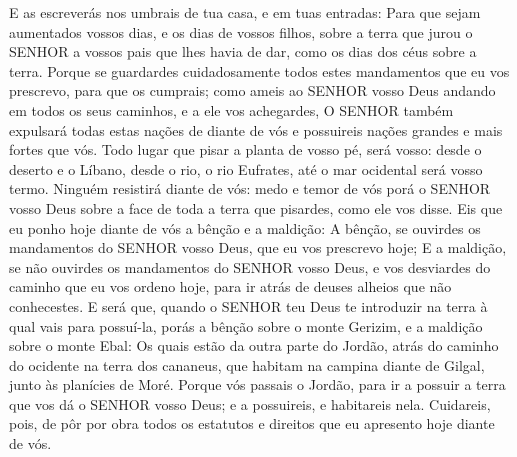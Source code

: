 {{  E as escreverás nos umbrais de tua casa, e em tuas entradas:
  Para que sejam aumentados vossos dias, e os dias de vossos filhos, sobre a terra que jurou o SENHOR a vossos pais que lhes havia de dar, como os dias dos céus sobre a terra.
  Porque se guardardes cuidadosamente todos estes mandamentos que eu vos prescrevo, para que os cumprais; como ameis ao SENHOR vosso Deus andando em todos os seus caminhos, e a ele vos achegardes,
  O SENHOR também expulsará todas estas nações de diante de vós e possuireis nações grandes e mais fortes que vós.
  Todo lugar que pisar a planta de vosso pé, será vosso: desde o deserto e o Líbano, desde o rio, o rio Eufrates, até o mar ocidental será vosso termo.
  Ninguém resistirá diante de vós: medo e temor de vós porá o SENHOR vosso Deus sobre a face de toda a terra que pisardes, como ele vos disse.
  Eis que eu ponho hoje diante de vós a bênção e a maldição:
  A bênção, se ouvirdes os mandamentos do SENHOR vosso Deus, que eu vos prescrevo hoje;
  E a maldição, se não ouvirdes os mandamentos do SENHOR vosso Deus, e vos desviardes do caminho que eu vos ordeno hoje, para ir atrás de deuses alheios que não conhecestes.
  E será que, quando o SENHOR teu Deus te introduzir na terra à qual vais para possuí-la, porás a bênção sobre o monte Gerizim, e a maldição sobre o monte Ebal:
  Os quais estão da outra parte do Jordão, atrás do caminho do ocidente na terra dos cananeus, que habitam na campina diante de Gilgal, junto às planícies de Moré.
  Porque vós passais o Jordão, para ir a possuir a terra que vos dá o SENHOR vosso Deus; e a possuireis, e habitareis nela.
  Cuidareis, pois, de pôr por obra todos os estatutos e direitos que eu apresento hoje diante de vós}.
\par }

